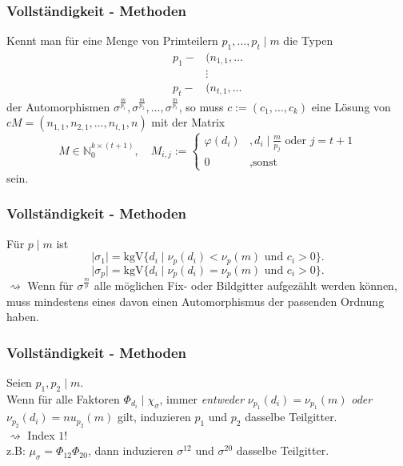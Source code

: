 \documentclass{beamer}
\newcommand{\N}{\mathbb{N}}
\newcommand{\kgV}{\text{kgV}}
\begin{document}
\begin{frame}[plain]
	\frametitle{Vollständigkeit - Methoden}
	Kennt man für eine Menge von Primteilern $p_1, \dots, p_t \mid m$ die Typen
	\begin{align*}
		p_1 - &(n_{1,1}, \dots\\
		&\vdots\\
		p_t - &(n_{t,1}, \dots
	\end{align*}
	der Automorphismen $\sigma^\frac{m}{p_1}, \sigma^\frac{m}{p_2}, \dots, \sigma^\frac{m}{p_t}$, so muss $c := (c_1, \dots, c_k)$ eine Lösung von $c M= (n_{1,1}, n_{2,1}, \dots, n_{t,1}, n)$ mit der Matrix
	\[M \in \N_0^{k \times (t+1)}, \quad M_{i,j} := \begin{cases} \varphi(d_i)	&, d_i \mid \frac{m}{p_j} \text{ oder } j = t+1\\ 0 &, \text{sonst}\end{cases}\]
sein.
\end{frame}

\begin{frame}[plain]
	\frametitle{Vollständigkeit - Methoden}
	Für $p \mid m$ ist 
	\[\vert \sigma_1 \vert = \kgV \lbrace d_i \mid \nu_p(d_i) < \nu_p(m) \text{ und } c_i > 0 \rbrace.\]
	\[\vert \sigma_p \vert = \kgV \lbrace d_i \mid \nu_p(d_i) = \nu_p(m) \text{ und } c_i > 0 \rbrace.\]
	\pause
	$\rightsquigarrow$ Wenn für $\sigma^\frac{m}{p}$ alle möglichen Fix- oder Bildgitter aufgezählt werden können, muss mindestens eines davon einen Automorphismus der passenden Ordnung haben.
\end{frame}

\begin{frame}[plain]
	\frametitle{Vollständigkeit - Methoden}
	Seien $p_1, p_2 \mid m$.\\
	Wenn für alle Faktoren $\Phi_{d_i} \mid \chi_\sigma$, immer \textit{entweder} $\nu_{p_1}(d_i) = \nu_{p_1}(m)$ \textit{oder} $\nu_{p_2}(d_i) = nu_{p_2}(m)$ gilt, induzieren $p_1$ und $p_2$ dasselbe Teilgitter.\\
	\pause
	$\rightsquigarrow$ Index $1$!\\
	\pause
	z.B: $\mu_\sigma = \Phi_{12} \Phi_{20}$, dann induzieren $\sigma^{12}$ und $\sigma^{20}$ dasselbe Teilgitter.
\end{frame}
\end{document}
